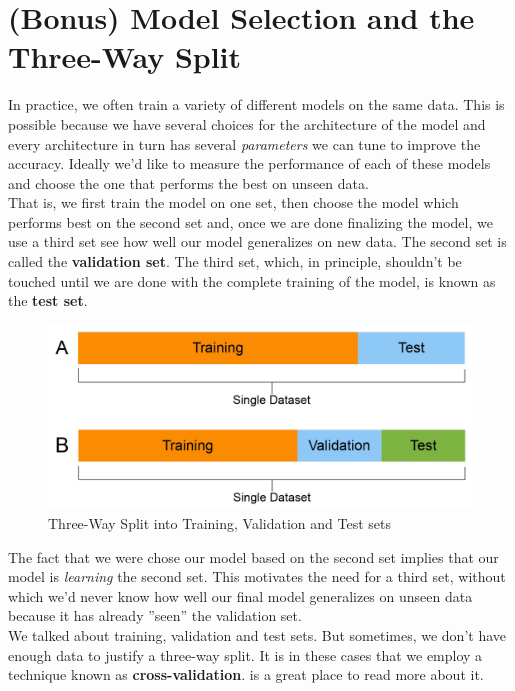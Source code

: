 \documentclass[12pt]{article}
\begin{document}
\section{(Bonus) Model Selection and the Three-Way Split}
\noindent
In practice, we often train a variety of different models on the same data. This is possible because we have several choices for the architecture of the model and every architecture in turn has several \textit{parameters} we can tune to improve the accuracy. Ideally we'd like to measure the performance of each of these models and choose the one that performs the best on unseen data. 
\\

\noindent That is, we first train the model on one set, then choose the model which performs best on the second set and, once we are done finalizing the model, we use a third set see how well our model generalizes on new data. The second set is called the \textbf{validation set}. The third set, which, in principle, shouldn't be touched until we are done with the complete training of the model, is known as the \textbf{test set}. 
\\
\begin{figure}[h]

\centering
\includegraphics[scale=0.3]{validation.png}
\caption{Three-Way Split into Training, Validation and Test sets}
\end{figure}


\noindent The fact that we were chose our model based on the second set implies that our model is \textit{learning} the second set. This motivates the need for a third set, without which we'd never know how well our final model generalizes on unseen data because it has already ''seen'' the validation set. 
\\

\noindent We talked about training, validation and test sets. But sometimes, we don't have enough data to justify a three-way split. It is in these cases that we employ a technique known as \textbf{cross-validation}.  \cite{crossvalidation} is a great place to read more about it.
\end{document}
